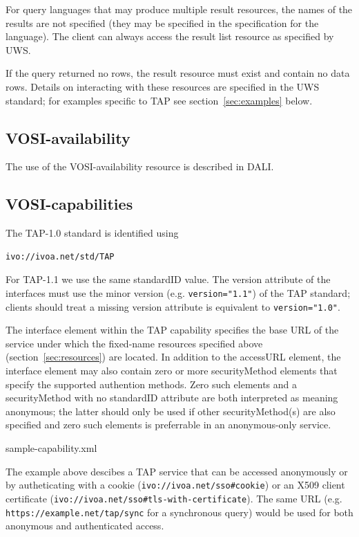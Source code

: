 \documentclass[11pt,letter]{ivoa}
\begin{document}
For query languages that may produce multiple result resources, the names of the 
results are not specified (they may be specified in the specification for the 
language). The client can always access the result list resource as specified by 
UWS.

If the query returned no rows, the result resource must exist and contain no 
data rows. Details on interacting with these resources are specified in the UWS 
standard; for examples specific to TAP see section~\ref{sec:examples} below.

\subsection{VOSI-availability}
\label{sec:vosi-availability}

The use of the VOSI-availability resource is described in DALI.

\subsection{VOSI-capabilities}
\label{sec:vosi-capabilities}

The TAP-1.0 standard is identified using 
\begin{verbatim}
ivo://ivoa.net/std/TAP
\end{verbatim}

For TAP-1.1 we use the same standardID value. The version attribute of the interfaces 
must use the minor version (e.g. \verb|version="1.1"|) of the TAP standard; clients 
should treat a missing version attribute is equivalent to \verb|version="1.0"|.

The interface element within the TAP capability specifies the base URL of the service 
under which the fixed-name resources specified above (section~\ref{sec:resources}) are located.
In addition to the accessURL element, the interface element may also contain zero or more securityMethod 
elements that specify the supported authention methods. Zero such elements and a securityMethod with no standardID attribute are both interpreted as meaning anonymous; the latter should only be used if other securityMethod(s) are also specified and zero such elements is preferrable in an anonymous-only service.


  {sample-capability.xml}

The example above descibes a TAP service that can be accessed anonymously or by autheticating with a cookie
(\verb|ivo://ivoa.net/sso#cookie|) or an X509 client certificate (\verb|ivo://ivoa.net/sso#tls-with-certificate|).
The same URL (e.g. \verb|https://example.net/tap/sync| for a synchronous query) would be used for both anonymous and authenticated access. 
\end{document}
